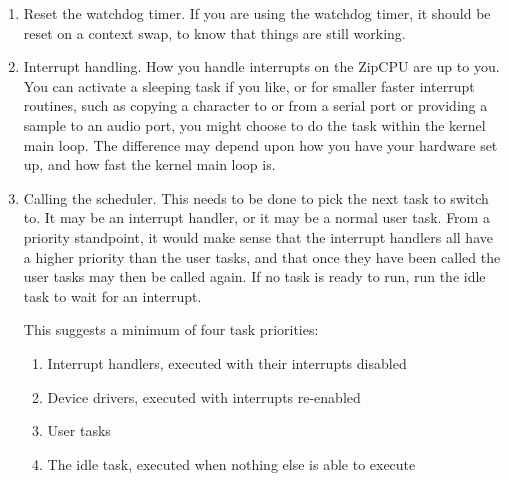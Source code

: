 \documentclass{gqtekspec}
\begin{document}
\begin{enumerate}
\item Reset the watchdog timer.  If you are using the watchdog timer, it should
	be reset on a context swap, to know that things are still working.

\item Interrupt handling.  How you handle interrupts on the ZipCPU are up to
	you.  You can activate a sleeping task if you like, or for smaller
	faster interrupt routines, such as copying a character to or from a 
	serial port or providing a sample to an audio port, you might choose
	to do the task within the kernel main loop.  The difference may 
	depend upon how you have your hardware set up, and how fast the
	kernel main loop is.

\item Calling the scheduler.  This needs to be done to pick the next task
	to switch to.  It may be an interrupt handler, or it may  be a normal
	user task.  From a priority standpoint, it would make sense that the
	interrupt handlers all have a higher priority than the user tasks,
	and that once they have been called the user tasks may then be called
	again.  If no task is ready to run, run the idle task to wait for an
	interrupt.

	This suggests a minimum of four task priorities:
	\begin{enumerate}
	\item Interrupt handlers, executed with their interrupts disabled
	\item Device drivers, executed with interrupts re-enabled
	\item User tasks
	\item The idle task, executed when nothing else is able to execute
	\end{enumerate}



\end{enumerate}
\end{document}
